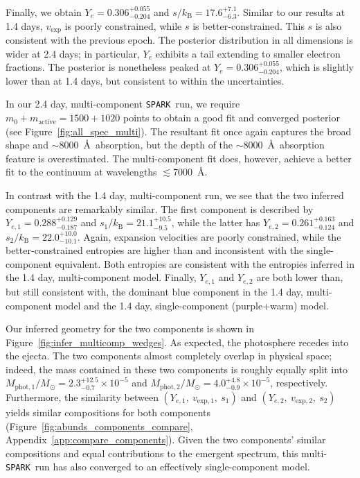 \documentclass[twocolumn,twocolappendix]{aastex63}
\def\SPARK{\texttt{SPARK}}
\begin{document}
Finally, we obtain $Y_e = 0.306^{+0.055}_{-0.204}$ and $s/k_{\mathrm{B}} = 17.6^{+7.1}_{-6.3}$. Similar to our results at 1.4 days, $v_{\mathrm{exp}}$ is poorly constrained, while $s$ is better-constrained. This $s$ is also consistent with the previous epoch. The posterior distribution in all dimensions is wider at 2.4 days; in particular, $Y_e$ exhibits a tail extending to smaller electron fractions. The posterior is nonetheless peaked at $Y_e = 0.306^{+0.055}_{-0.204}$, which is slightly lower than at 1.4 days, but consistent to within the uncertainties. 

In our 2.4 day, multi-component \SPARK~run, we require $m_0 + m_{\mathrm{active}} = 1500 + 1020$ points to obtain a good fit and converged posterior (see Figure~\ref{fig:all_spec_multi}). The resultant fit once again captures the broad shape and $\sim$8000~\AA~absorption, but the depth of the $\sim$8000~\AA~absorption feature is overestimated. The multi-component fit does, however, achieve a better fit to the continuum at wavelengths $\lesssim$7000~\AA. 

In contrast with the 1.4 day, multi-component run, we see that the two inferred components are remarkably similar. The first component is described by $Y_{e,1} = 0.288^{+0.129}_{-0.187}$ and $s_1 / k_{\mathrm{B}} = 21.1^{+10.5}_{-9.5}$, while the latter has $Y_{e,2} = 0.261^{+0.163}_{-0.124}$ and $s_2 / k_{\mathrm{B}} = 22.0^{+10.0}_{-10.1}$. Again, expansion velocities are poorly constrained, while the better-constrained entropies are higher than and inconsistent with the single-component equivalent. Both entropies are consistent with the entropies inferred in the 1.4 day, multi-component model. Finally, $Y_{e,1}$ and $Y_{e,2}$ are both lower than, but still consistent with, the dominant blue component in the 1.4 day, multi-component model and the 1.4 day, single-component (purple+warm) model.

Our inferred geometry for the two components is shown in Figure~\ref{fig:infer_multicomp_wedges}. As expected, the photosphere recedes into the ejecta. The two components almost completely overlap in physical space; indeed, the mass contained in these two components is roughly equally split into $M_{\mathrm{phot},1}/M_{\odot} = 2.3^{+12.5}_{-0.7} \times 10^{-5}$ and $M_{\mathrm{phot},2}/M_{\odot} = 4.0^{+4.8}_{-0.9} \times 10^{-5}$, respectively. Furthermore, the similarity between $(Y_{e,1},~v_{\mathrm{exp},1},~s_1)$ and $(Y_{e,2},~v_{\mathrm{exp},2},~s_2)$ yields similar compositions for both components (Figure~\ref{fig:abunds_components_compare}, Appendix~\ref{app:compare_components}). Given the two components' similar compositions and equal contributions to the emergent spectrum, this multi-\SPARK~run has also converged to an effectively single-component model.
\end{document}
